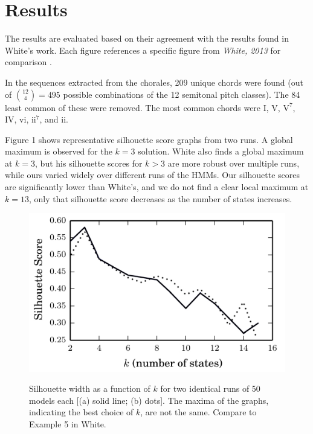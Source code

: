\documentclass[letterpaper]{article}
\begin{document}
\section{Results}
The results are evaluated based on their agreement with the results found in White's work. Each figure references a specific figure from \emph{White, 2013} for comparison \cite{white}.

In the sequences extracted from the chorales, 209 unique chords were found (out of ${12 \choose 4} = 495$ possible combinations of the 12 semitonal pitch classes). The 84 least common of these were removed. The most common chords were I, V, $\mathrm{V^7}$, IV, vi,  $\mathrm{ii^7}$, and ii.

Figure 1 shows representative silhouette score graphs from two runs. A global maximum is observed for the $k=3$ solution. White also finds a global maximum at $k=3$, but his silhouette scores for $k > 3$ are more robust over multiple runs, while ours varied widely over different runs of the HMMs. Our silhouette scores are significantly lower than White's, and we do not find a clear local maximum at $k=13$, only that silhouette score decreases as the number of states increases.

\begin{figure}
\vspace{-10pt}
    \includegraphics[width=\columnwidth]{fig1.pdf}
\label{fig:first_sub}
\vspace{-10pt}
    \caption{Silhouette width as a function of $k$ for two identical runs of 50 models each [(a) solid line; (b) dots]. The maxima of the graphs, indicating the best choice of $k$, are not the same. Compare to Example 5 in White.}
\vspace{-10pt}
\end{figure}
\end{document}
